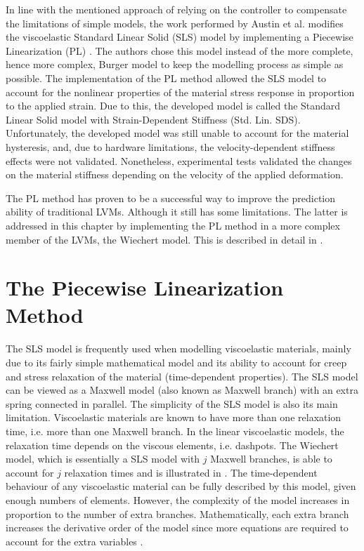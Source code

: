 In line with the mentioned approach of relying on the controller to compensate the limitations of simple models, the work performed by Austin et al. modifies the viscoelastic Standard Linear Solid (SLS) model by implementing a Piecewise Linearization (PL) \cite{austin2015control}. The authors chose this model instead of the more complete, hence more complex, Burger model to keep the modelling process as simple as possible. The implementation of the PL method allowed the SLS model to account for the nonlinear properties of the material stress response in proportion to the applied strain. Due to this, the developed model is called the Standard Linear Solid model with Strain-Dependent Stiffness (Std. Lin. SDS). Unfortunately, the developed model was still unable to account for the material hysteresis, and, due to hardware limitations, the velocity-dependent stiffness effects were not validated. Nonetheless, experimental tests validated the changes on the material stiffness depending on the velocity of the applied deformation.

The PL method has proven to be a successful way to improve the prediction ability of traditional LVMs. Although it still has some limitations. The latter is addressed in this chapter by implementing the PL method in a more complex member of the LVMs, the Wiechert model. This is described in detail in .

\section{The Piecewise Linearization Method} \label{sec:wiechert}

The SLS model is frequently used when modelling viscoelastic materials, mainly due to its fairly simple mathematical model and its ability to account for creep and stress relaxation of the material (time-dependent properties). The SLS model can be viewed as a Maxwell model (also known as Maxwell branch) with an extra spring connected in parallel. The simplicity of the SLS model is also its main limitation. 
Viscoelastic materials are known to have more than one relaxation time, i.e. more than one Maxwell branch. In the linear viscoelastic models, the relaxation time depends on the viscous elements, i.e. dashpots. The Wiechert model, which is essentially a SLS model with $j$ Maxwell branches, is able to account for $j$ relaxation times and is illustrated in . The time-dependent behaviour of any viscoelastic material can be fully described by this model, given enough numbers of elements. However, the complexity of the model increases in proportion to the number of extra branches. Mathematically, each extra branch increases the derivative order of the model since more equations are required to account for the extra variables \cite{tirella2014strain,roylance2001engineering}.

